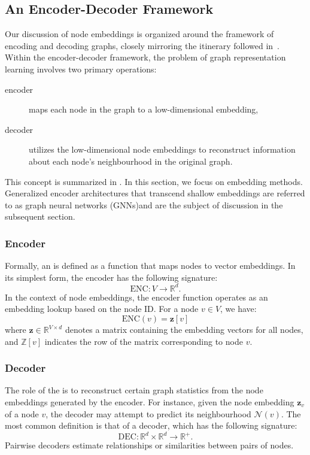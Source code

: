 \subsection{An Encoder-Decoder Framework}
Our discussion of node embeddings is organized around the framework of encoding and decoding graphs, closely mirroring the itinerary followed in~\cite{Hamilton2020GraphRL}. Within the encoder-decoder framework, the problem of graph representation learning involves two primary operations:
\begin{description}
    \item[encoder] maps each node in the graph to a low-dimensional embedding,
    \item[decoder] utilizes the low-dimensional node embeddings to reconstruct information about each node's neighbourhood in the original graph.
\end{description}
This concept is summarized in . In this section, we focus on  embedding methods. Generalized encoder architectures that transcend shallow embeddings are referred to as graph neural networks (GNNs)and are the subject of discussion in the subsequent section.



\subsubsection{Encoder}
Formally, an  is defined as a function that maps nodes to vector embeddings. In its simplest form, the encoder has the following signature:
\begin{equation*}
    \text{ENC}: V \to \mathbb{R}^d.
\end{equation*}
In the context of  node embeddings, the encoder function operates as an embedding lookup based on the node ID. For a node $ v\in V $, we have:
\begin{equation}\label{eq:encoderLookup}
    \text{ENC}(v) = \mathbf{z}[v]
\end{equation}
where $ \mathbf{z}\in \mathbb{R}^{V\times d} $ denotes a matrix containing the embedding vectors for all nodes, and $ \mathbb{Z}[v] $ indicates the row of the matrix corresponding to node $ v $.

\subsubsection{Decoder}\label{sec:decoder}
The role of the  is to reconstruct certain graph statistics from the node embeddings generated by the encoder. For instance, given the node embedding $ \mathbf{z}_v $ of a node $ v $, the decoder may attempt to predict its neighbourhood $ \mathcal{N}(v) $. The most common definition is that of a  decoder, which has the following signature:
\begin{equation*}
    \text{DEC}: \mathbb{R}^d \times \mathbb{R}^d \to \mathbb{R}^+.
\end{equation*}
Pairwise decoders estimate relationships or similarities between pairs of nodes. 

